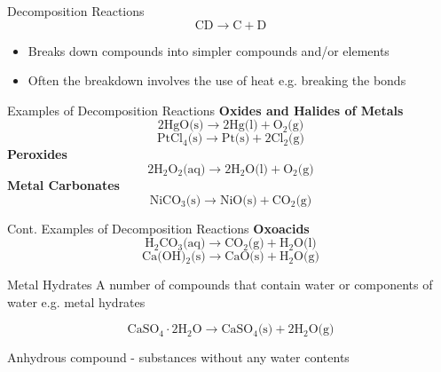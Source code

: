 \documentclass[11pt]{beamer}
\begin{document}
\begin{frame}{Decomposition Reactions}
  \begin{equation}
    \text{CD} \rightarrow \text{C} + \text{D}
  \end{equation}
  \begin{itemize}
  \item Breaks down compounds into simpler compounds and/or elements
  \item Often the breakdown involves the use of heat e.g. breaking the
    bonds
  \end{itemize}
\end{frame}

\begin{frame}{Examples of Decomposition Reactions}
  \textbf{Oxides and Halides of Metals}
  \begin{equation}
    2\text{HgO(s)} \rightarrow 2\text{Hg(l)} + \text{O}_2\text{(g)}
  \end{equation}
  \begin{equation}
    \text{PtCl$_4$(s)} \rightarrow \text{Pt(s)} + 2\text{Cl$_2$(g)}
  \end{equation}
  \textbf{Peroxides}
  \begin{equation}
    2\text{H$_2$O$_2$(aq)} \rightarrow 2\text{H$_2$O(l)} + \text{O$_2$(g)}
  \end{equation}
  \textbf{Metal Carbonates}
  \begin{equation}
    \text{NiCO$_3$(s)} \rightarrow \text{NiO(s)} + \text{CO$_2$(g)}
  \end{equation}
\end{frame}

\begin{frame}{Cont. Examples of Decomposition Reactions}
  \textbf{Oxoacids}
  \begin{equation}
    \text{H$_2$CO$_3$(aq)} \rightarrow \text{CO$_2$(g)} + \text{H$_2$O(l)}
  \end{equation}
  \begin{equation}
    \text{Ca(OH)$_2$(s)} \rightarrow \text{CaO(s)} + \text{H$_2$O(g)}
  \end{equation}
\end{frame}

\begin{frame}{Metal Hydrates}
  A number of compounds that contain water or components of water e.g.
  metal hydrates
  
  \begin{equation}
    \text{CaSO$_4$}\cdot\text{2H$_2$O}\rightarrow \text{CaSO$_4$(s)} + 2\text{H$_2$O(g)}
  \end{equation}

  Anhydrous compound - substances without any water contents
\end{frame}
\end{document}
